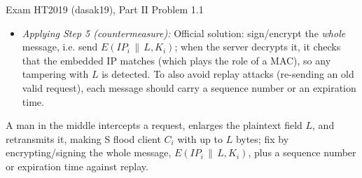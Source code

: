 \documentclass[12pt, a4paper]{article}
\begin{document}
\begin{practicebox}{Exam HT2019 (dasak19), Part II Problem 1.1}
\begin{itemize}
    The attacker intercepts a legitimate request $\langle IP_i, IP_S, X, L \rangle$ from client $C_i$, changes $L$ to a much larger value, and retransmits the message.

    The check $D(X, K_i) = IP_i$ still passes ($X$ was not touched), so S generates $L$ bytes of random data and streams them in 512~KB blocks to $IP_i$ --- the victim client $C_i$ is flooded with traffic it never asked for, and the attacker's own bandwidth is irrelevant because S supplies the flood.
    \item \textit{Applying Step 5 (countermeasure):} Official solution: sign/encrypt the \emph{whole} message, i.e. send $E(IP_i \,\|\, L, K_i)$; when the server decrypts it, it checks that the embedded IP matches (which plays the role of a MAC), so any tampering with $L$ is detected.
    To also avoid replay attacks (re-sending an old valid request), each message should carry a sequence number or an expiration time.
\end{itemize}

\begin{answerbox}
A man in the middle intercepts a request, enlarges the plaintext field $L$, and retransmits it, making S flood client $C_i$ with up to $L$ bytes; fix by encrypting/signing the whole message, $E(IP_i \,\|\, L, K_i)$, plus a sequence number or expiration time against replay.
\end{answerbox}
\end{practicebox}
\end{document}
